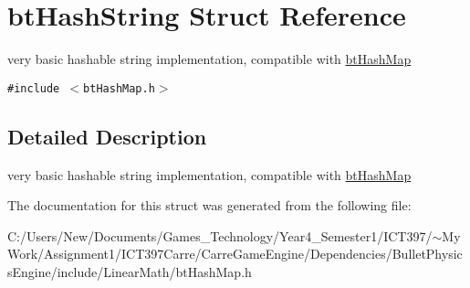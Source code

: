 \hypertarget{structbt_hash_string}{
\section{btHashString Struct Reference}
\label{structbt_hash_string}
}
very basic hashable string implementation, compatible with \hyperlink{classbt_hash_map}{btHashMap}  


{\tt \#include $<$btHashMap.h$>$}



\subsection{Detailed Description}
very basic hashable string implementation, compatible with \hyperlink{classbt_hash_map}{btHashMap} 

The documentation for this struct was generated from the following file:\begin{CompactItemize}
\item 
C:/Users/New/Documents/Games\_\-Technology/Year4\_\-Semester1/ICT397/$\sim$My Work/Assignment1/ICT397Carre/CarreGameEngine/Dependencies/BulletPhysicsEngine/include/LinearMath/btHashMap.h\end{CompactItemize}
